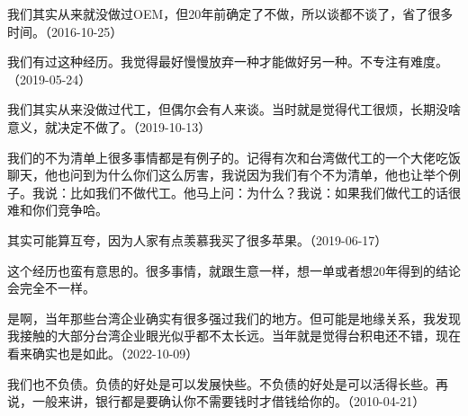 我们其实从来就没做过OEM，但20年前确定了不做，所以谈都不谈了，省了很多时间。（2016-10-25）


我们有过这种经历。我觉得最好慢慢放弃一种才能做好另一种。不专注有难度。（2019-05-24）


我们其实从来没做过代工，但偶尔会有人来谈。当时就是觉得代工很烦，长期没啥意义，就决定不做了。（2019-10-13）


我们的不为清单上很多事情都是有例子的。记得有次和台湾做代工的一个大佬吃饭聊天，他也问到为什么你们这么厉害，我说因为我们有个不为清单，他也让举个例子。我说：比如我们不做代工。他马上问：为什么？我说：如果我们做代工的话很难和你们竞争哈。


其实可能算互夸，因为人家有点羡慕我买了很多苹果。（2019-06-17）


这个经历也蛮有意思的。很多事情，就跟生意一样，想一单或者想20年得到的结论会完全不一样。


是啊，当年那些台湾企业确实有很多强过我们的地方。但可能是地缘关系，我发现我接触的大部分台湾企业眼光似乎都不太长远。当年就是觉得台积电还不错，现在看来确实也是如此。（2022-10-09）



我们也不负债。负债的好处是可以发展快些。不负债的好处是可以活得长些。再说，一般来讲，银行都是要确认你不需要钱时才借钱给你的。（2010-04-21）

